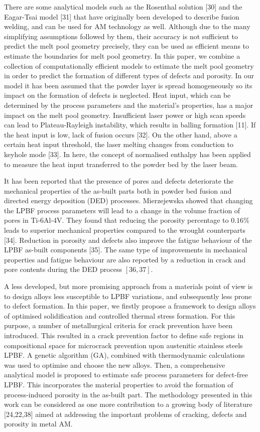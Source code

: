\documentclass[10pt]{article}
\begin{document}
There are some analytical models such as the Rosenthal solution [30] and the Eagar-Tsai model [31] that have originally been developed to describe fusion welding, and can be used for AM technology as well. Although due to the many simplifying assumptions followed by them, their accuracy is not sufficient to predict the melt pool geometry precisely, they can be used as efficient means to estimate the boundaries for melt pool geometry. In this paper, we combine a collection of computationally efficient models to estimate the melt pool geometry in order to predict the formation of different types of defects and porosity. In our model it has been assumed that the powder layer is spread homogeneously so its impact on the formation of defects is neglected. Heat input, which can be determined by the process parameters and the material's properties, has a major impact on the melt pool geometry. Insufficient laser power or high scan speeds can lead to Plateau-Rayleigh instability, which results in balling formation [11]. If the heat input is low, lack of fusion occurs [32]. On the other hand, above a certain heat input threshold, the laser melting changes from conduction to keyhole mode [33]. In here, the concept of normalised enthalpy has been applied to measure the heat input transferred to the powder bed by the laser beam.

It has been reported that the presence of pores and defects deteriorate the mechanical properties of the as-built parts both in powder bed fusion and directed energy deposition (DED) processes. Mierzejewska showed that changing the LPBF process parameters will lead to a change in the volume fraction of pores in Ti-6Al-4V. They found that reducing the porosity percentage to $0.16 \%$ leads to superior mechanical properties compared to the wrought counterparts [34]. Reduction in porosity and defects also improve the fatigue behaviour of the LPBF as-built components [35]. The same type of improvements in mechanical properties and fatigue behaviour are also reported by a reduction in crack and pore contents during the DED process $[36,37]$.

A less developed, but more promising approach from a materials point of view is to design alloys less susceptible to LPBF variations, and subsequently less prone to defect formation. In this paper, we firstly propose a framework to design alloys of optimised solidification and controlled thermal stress formation. For this purpose, a number of metallurgical criteria for crack prevention have been introduced. This resulted in a crack prevention factor to define safe regions in compositional space for microcrack prevention upon austenitic stainless steels LPBF. A genetic algorithm (GA), combined with thermodynamic calculations was used to optimise and choose the new alloys. Then, a comprehensive analytical model is proposed to estimate safe process parameters for defect-free LPBF. This incorporates the material properties to avoid the formation of process-induced porosity in the as-built part. The methodology presented in this work can be considered as one more contribution to a growing body of literature [24,22,38] aimed at addressing the important problems of cracking, defects and porosity in metal AM.
\end{document}
